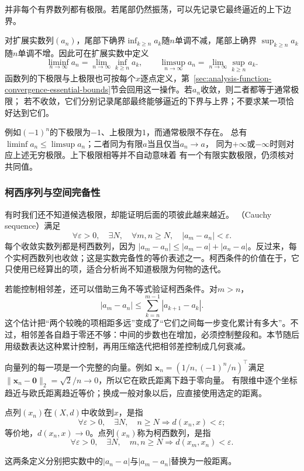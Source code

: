 并非每个有界数列都有极限。若尾部仍然振荡，可以先记录它最终逼近的上下边界。

\begin{definition}[数列的上极限与下极限]
\label{def:analysis-liminf-limsup}
对扩展实数列$(a_n)$，尾部下确界$\inf_{k\geq n}a_k$随$n$单调不减，尾部上确界
$\sup_{k\geq n}a_k$随$n$单调不增。因此可在扩展实数中定义
\[
  \liminf_{n\to\infty}a_n
  =
  \lim_{n\to\infty}\inf_{k\geq n}a_k,
  \qquad
  \limsup_{n\to\infty}a_n
  =
  \lim_{n\to\infty}\sup_{k\geq n}a_k.
\]
函数列的下极限与上极限也可按每个$x$逐点定义，第~\ref{sec:analysis-function-convergence-essential-bounds}节会回用这一操作。若$a_n$收敛，则二者都等于通常极限；
若不收敛，它们分别记录尾部最终能够逼近的下界与上界；不要求某一项恰好达到它们。
\end{definition}
例如$(-1)^n$的下极限为$-1$、上极限为$1$，而通常极限不存在。
总有$\liminf a_n\leq\limsup a_n$；二者同为有限$a$当且仅当$a_n\to a$，
同为$+\infty$或$-\infty$时则对应上述无穷极限。上下极限相等并不自动意味着
有一个有限实数极限，仍须核对共同值。


\subsubsection{柯西序列与空间完备性}
有时我们还不知道候选极限，却能证明后面的项彼此越来越近。
（Cauchy sequence）满足
\[   \forall\varepsilon>0,\quad   \exists N,\quad   \forall m,n\geq N,\quad |a_m-a_n|<\varepsilon. \]
每个收敛实数列都是柯西数列，因为 $|a_m-a_n|\leq|a_m-a|+|a_n-a|$。反过来，每个实柯西数列也收敛；这是实数完备性的等价表述之一。柯西条件的价值在于，它只使用已经算出的项，适合分析尚不知道极限为何物的迭代。

若能控制相邻差，还可以借助三角不等式验证柯西条件。对$m>n$，
\begin{equation}
  |a_m-a_n|
  \leq
  \sum_{k=n}^{m-1}|a_{k+1}-a_k|.
\label{eq:analysis-cauchy-tail-bound}
\end{equation}
这个估计把“两个较晚的项相距多远”变成了“它们之间每一步变化累计有多大”。不过，相邻差各自趋于零还不够：中间的步数也在增加，必须控制整段和。本节随后用级数表达这种累计控制，再用压缩迭代把相邻差控制成几何衰减。


向量列的每一项是一个完整的向量。例如
$\bm x_n=(1/n,(-1)^n/n)^\top$满足
$\lVert\bm x_n-\bm0\rVert_2=\sqrt2/n\to0$，所以它在欧氏距离下趋于零向量。
有限维中逐个坐标趋近与欧氏距离趋近等价；换成一般对象以后，应直接使用选定的距离。
\begin{definition}[度量空间中的收敛与柯西数列]
\label{def:analysis-metric-sequence-convergence}
点列$(x_n)$在$(X,d)$中收敛到$x$，是指
\[
  \forall\varepsilon>0,\quad
  \exists N,\quad
  n\geq N\Longrightarrow d(x_n,x)<\varepsilon;
\]
等价地，$d(x_n,x)\to0$。点列$(x_n)$称为柯西数列，是指
\[
  \forall\varepsilon>0,\quad
  \exists N,\quad
  m,n\geq N\Longrightarrow d(x_m,x_n)<\varepsilon.
\]
\end{definition}
这两条定义分别把实数中的$|a_n-a|$与$|a_m-a_n|$替换为一般距离。

